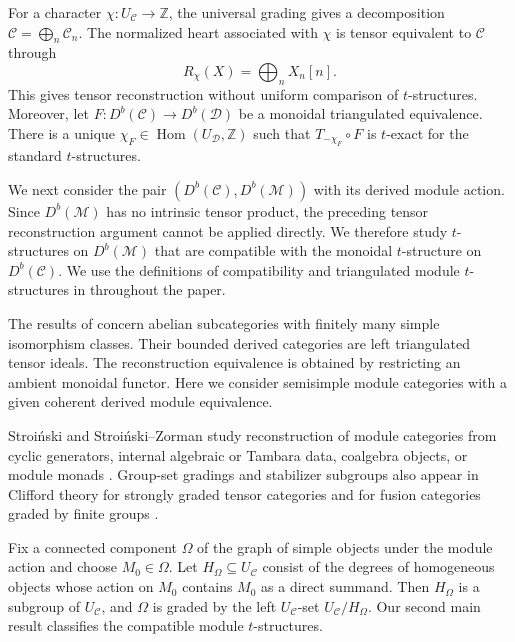 \documentclass[11pt]{amsart}
\newcommand{\C}{\mathcal C}
\newcommand{\D}{\mathcal D}
\newcommand{\M}{\mathcal M}
\DeclareMathOperator{\Hom}{Hom}
\theoremstyle{definition}
\theoremstyle{remark}
\theoremstyle{plain}
\begin{document}
For a character $\chi: U_{\C}\to\mathbb Z$, the universal grading gives a decomposition $\C=\bigoplus_n\C_n$. The normalized heart associated with $\chi$ is tensor equivalent to $\C$ through
\begin{equation*}
R_\chi(X)=\bigoplus_n X_n[n].
\end{equation*}
This gives tensor reconstruction without uniform comparison of $t$-structures. Moreover, let $F: D^b(\C)\to D^b(\D)$ be a monoidal triangulated equivalence. There is a unique $\chi_F\in\Hom(U_{\D},\mathbb Z)$ such that $T_{-\chi_F}\circ F$ is $t$-exact for the standard $t$-structures.

We next consider the pair $(D^b(\C),D^b(\M))$ with its derived module action. Since $D^b(\M)$ has no intrinsic tensor product, the preceding tensor reconstruction argument cannot be applied directly. We therefore study $t$-structures on $D^b(\M)$ that are compatible with the monoidal $t$-structure on $D^b(\C)$. We use the definitions of compatibility and triangulated module $t$-structures in \cite[Definitions~3.1 and 3.4]{Yu} throughout the paper.

The results of \cite[Theorem~4.5 and Corollary~4.7]{Yu} concern abelian subcategories with finitely many simple isomorphism classes. Their bounded derived categories are left triangulated tensor ideals. The reconstruction equivalence is obtained by restricting an ambient monoidal functor. Here we consider semisimple module categories with a given coherent derived module equivalence.

Stroi\'nski and Stroi\'nski--Zorman study reconstruction of module categories from cyclic generators, internal algebraic or Tambara data, coalgebra objects, or module monads \cite{Stroinski,StroinskiZorman}. Group-set gradings and stabilizer subgroups also appear in Clifford theory for strongly graded tensor categories and for fusion categories graded by finite groups \cite{Galindo,GalindoGraded,MeirMusicantov}.

Fix a connected component $\Omega$ of the graph of simple objects under the module action and choose $M_0\in\Omega$. Let $H_\Omega\subseteq U_{\C}$ consist of the degrees of homogeneous objects whose action on $M_0$ contains $M_0$ as a direct summand. Then $H_\Omega$ is a subgroup of $U_{\C}$, and $\Omega$ is graded by the left $U_{\C}$-set $U_{\C}/H_\Omega$. Our second main result classifies the compatible module $t$-structures.
\end{document}
